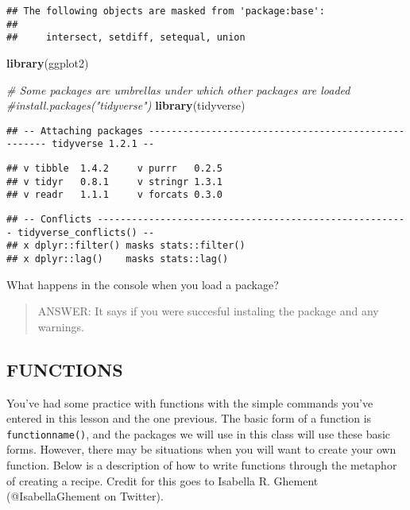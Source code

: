 \documentclass[]{article}
\newenvironment{Shaded}{\begin{snugshade}}{\end{snugshade}}
\newcommand{\KeywordTok}[1]{\textcolor[rgb]{0.13,0.29,0.53}{\textbf{#1}}}
\newcommand{\CommentTok}[1]{\textcolor[rgb]{0.56,0.35,0.01}{\textit{#1}}}
\newcommand{\NormalTok}[1]{#1}
\begin{document}
\begin{verbatim}
## The following objects are masked from 'package:base':
## 
##     intersect, setdiff, setequal, union
\end{verbatim}

\begin{Shaded}
\begin{Highlighting}[]
\KeywordTok{library}\NormalTok{(ggplot2)}

\CommentTok{# Some packages are umbrellas under which other packages are loaded}
\CommentTok{#install.packages("tidyverse")}
\KeywordTok{library}\NormalTok{(tidyverse)}
\end{Highlighting}
\end{Shaded}

\begin{verbatim}
## -- Attaching packages ---------------------------------------------------- tidyverse 1.2.1 --
\end{verbatim}

\begin{verbatim}
## v tibble  1.4.2     v purrr   0.2.5
## v tidyr   0.8.1     v stringr 1.3.1
## v readr   1.1.1     v forcats 0.3.0
\end{verbatim}

\begin{verbatim}
## -- Conflicts ------------------------------------------------------- tidyverse_conflicts() --
## x dplyr::filter() masks stats::filter()
## x dplyr::lag()    masks stats::lag()
\end{verbatim}

What happens in the console when you load a package?

\begin{quote}
ANSWER: It says if you were succesful instaling the package and any
warnings.
\end{quote}

\subsection{FUNCTIONS}\label{functions}

You've had some practice with functions with the simple commands you've
entered in this lesson and the one previous. The basic form of a
function is \texttt{functionname()}, and the packages we will use in
this class will use these basic forms. However, there may be situations
when you will want to create your own function. Below is a description
of how to write functions through the metaphor of creating a recipe.
Credit for this goes to Isabella R. Ghement (@IsabellaGhement on
Twitter).
\end{document}
